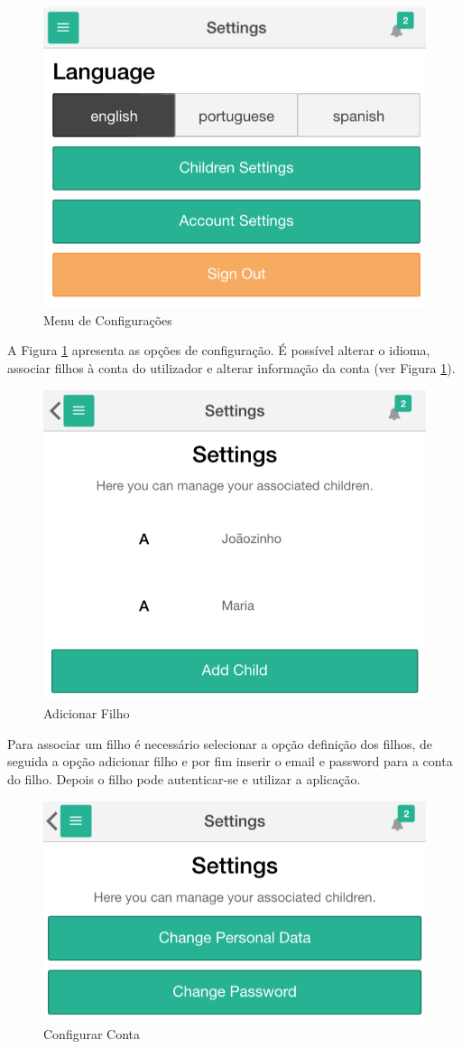 \begin{figure}[H]
	\begin{center}
		\includegraphics[width=0.5
		\textwidth]{settings/settings_menu.png}
	\end{center}
	\caption{Menu de Configurações}
	\label{fig:9}
\end{figure}

A Figura \ref{fig:9} apresenta as opções de configuração. É possível alterar o idioma, associar filhos à conta do utilizador e alterar informação da conta (ver Figura \ref{fig:9}).

\begin{figure}[H]
	\begin{center}
		\includegraphics[width=0.5
		\textwidth]{settings/child_settings.png}
	\end{center}
	\caption{Adicionar Filho}
	\label{fig:9_1}
\end{figure}

Para associar um filho é necessário selecionar a opção definição dos filhos, de seguida a opção adicionar filho e por fim inserir o email e password para a conta do filho. Depois o filho pode autenticar-se e utilizar a aplicação.

\begin{figure}[H]
	\begin{center}
		\includegraphics[width=0.5
		\textwidth]{settings/account_settings.png}
	\end{center}
	\caption{Configurar Conta}
	\label{fig:9_2}
\end{figure}

